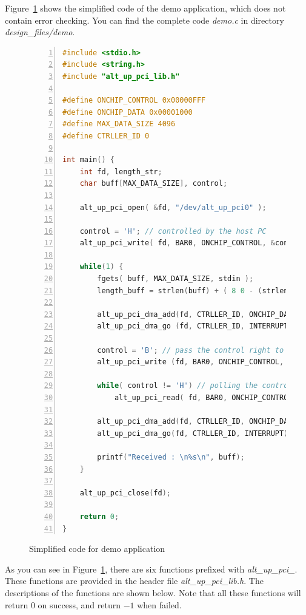\documentclass[11pt, twoside, pdftex]{article}
\begin{document}
Figure~\ref{fig:demo_application} shows the simplified code of the demo application, which does not contain error checking. You can find the complete code {\it demo.c} in directory {\it design\_files/demo}.

\begin{figure}[H]
	\begin{lstlisting}[language=C, stepnumber=1, numbers=left]
#include <stdio.h>
#include <string.h>
#include "alt_up_pci_lib.h"

#define ONCHIP_CONTROL 0x00000FFF
#define ONCHIP_DATA 0x00001000
#define MAX_DATA_SIZE 4096
#define CTRLLER_ID 0

int main() {
    int fd, length_str;
    char buff[MAX_DATA_SIZE], control;

    alt_up_pci_open( &fd, "/dev/alt_up_pci0" );

    control = 'H'; // controlled by the host PC
    alt_up_pci_write( fd, BAR0, ONCHIP_CONTROL, &control, sizeof(control) );

    while(1) {
        fgets( buff, MAX_DATA_SIZE, stdin );
        length_buff = strlen(buff) + ( 8 0 - (strlen(buff)%8) );

        alt_up_pci_dma_add(fd, CTRLLER_ID, ONCHIP_DATA, buff, length_str, TO_DEVICE);
        alt_up_pci_dma_go (fd, CTRLLER_ID, INTERRUPT);

        control = 'B'; // pass the control right to the DE4 board
        alt_up_pci_write (fd, BAR0, ONCHIP_CONTROL, &control, sizeof(control) );

        while( control != 'H') // polling the control byte
            alt_up_pci_read( fd, BAR0, ONCHIP_CONTROL, &control, sizeof(control) );

        alt_up_pci_dma_add(fd, CTRLLER_ID, ONCHIP_DATA, buff, length_str, FROM_DEVICE);
        alt_up_pci_dma_go(fd, CTRLLER_ID, INTERRUPT) ;

        printf("Received : \n%s\n", buff);
    }

    alt_up_pci_close(fd);

    return 0;
}
	\end{lstlisting}
	\caption{Simplified code for demo application}%
	\label{fig:demo_application}%
\end{figure}

As you can see in Figure~\ref{fig:demo_application}, there are six functions prefixed with {\it alt\_up\_pci\_}. These functions are provided in the header file {\it alt\_up\_pci\_lib.h}. The descriptions of the functions are shown below. Note that all these functions will return $0$ on success, and return $-1$ when failed.
\end{document}
